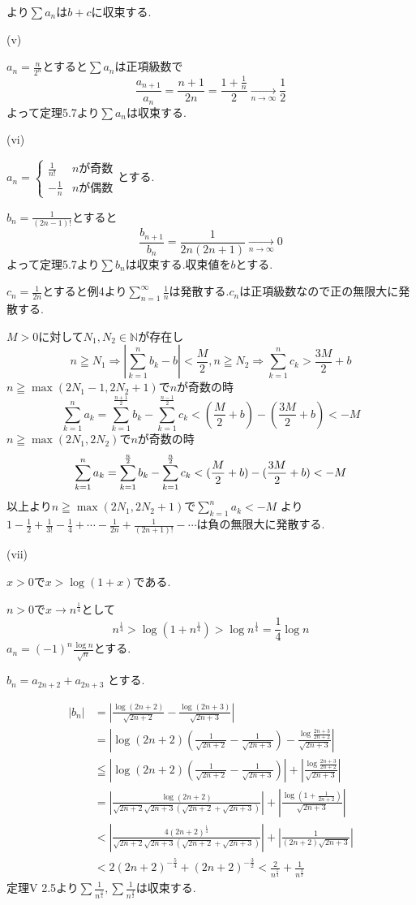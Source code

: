 \documentclass{jsarticle}
\begin{document}
より$\sum a_n$は$b+c$に収束する.

(v)

$a_n=\frac{n}{2^n}$とすると$\sum a_n$は正項級数で
\[\frac{a_{n+1}}{a_n}=\frac{n+1}{2n}=\frac{1+\frac{1}{n}}{2}\xrightarrow[n\to\infty]{}\frac{1}{2}\]
よって定理5.7より$\sum a_n$は収束する.

(vi)

$a_n = \begin{cases}
\frac{1}{n!} & nが奇数 \\
-\frac{1}{n} & nが偶数　
\end{cases}$とする.

$b_n=\frac{1}{(2n-1)!}$とすると
\[\frac{b_{n+1}}{b_n}=\frac{1}{2n(2n+1)}\xrightarrow[n\to\infty]{}0\]
よって定理5.7より$\sum b_n$は収束する.収束値を$b$とする.

$c_n=\frac{1}{2n}$とすると例4より$\displaystyle \sum_{n=1}^\infty \frac{1}{n}$は発散する.$c_n$は正項級数なので正の無限大に発散する.

$M > 0$に対して$N_1,N_2\in\mathbb{N}$が存在し
\[n\geqq N_1 \Rightarrow |\sum_{k=1}^nb_k-b| < \frac{M}{2},n\geqq N_2 \Rightarrow \sum_{k=1}^nc_k > \frac{3M}{2}+b\]
$n\geqq \max (2N_1-1,2N_2+1)$で$n$が奇数の時
\[\sum_{k=1}^n a_k = \sum_{k=1}^{\frac{n+1}{2}} b_k - \sum_{k=1}^{\frac{n-1}{2}}c_k
< (\frac{M}{2}+b) - (\frac{3M}{2}+b) < -M\]
$n\geqq \max (2N_1,2N_2)$で$n$が奇数の時
\[
\sum_{k=1}^n a_k = \sum_{k=1}^{\frac{n}{2}} b_k - \sum_{k=1}^{\frac{n}{2}}c_k\\
< (\frac{M}{2}+b) - (\frac{3M}{2}+b) < -M
\]
以上より$n\geqq \max (2N_1,2N_2+1)$で$\displaystyle\sum_{k=1}^n a_k < -M$
より$1-\frac{1}{2}+\frac{1}{3!}-\frac{1}{4}+\cdots -\frac{1}{2n}+\frac{1}{(2n+1)!}-\cdots$は負の無限大に発散する.

(vii)

$x > 0$で$x >\log (1+x)$である.

$n > 0$で$x\rightarrow n^{\frac{1}{4}}$として
\[n^\frac{1}{4} > \log (1+n^\frac{1}{4}) >\log n^\frac{1}{4} = \frac{1}{4}\log n\]
$a_n = (-1)^n\frac{\log n}{\sqrt{n}}$とする.

$b_n=a_{2n+2}+a_{2n+3}$
とする.

\begin{align*}
|b_n| &= |\frac{\log (2n+2)}{\sqrt{2n+2}}-\frac{\log (2n+3)}{\sqrt{2n+3}}|\\
&=|\log (2n+2) (\frac{1}{\sqrt{2n+2}}-\frac{1}{\sqrt{2n+3}}) - \frac{\log \frac{2n+3}{2n+2}}{\sqrt{2n+3}}|\\
&\leqq |\log (2n+2) (\frac{1}{\sqrt{2n+2}}-\frac{1}{\sqrt{2n+3}})| +| \frac{\log \frac{2n+3}{2n+2}}{\sqrt{2n+3}}|\\
&= |\frac{\log (2n+2)}{\sqrt{2n+2}\sqrt{2n+3}(\sqrt{2n+2}+\sqrt{2n+3})}| +|\frac{\log (1+\frac{1}{2n+2})}{\sqrt{2n+3}}|\\
& < |\frac{4(2n+2)^{\frac{1}{4}}}{\sqrt{2n+2}\sqrt{2n+3}(\sqrt{2n+2}+\sqrt{2n+3})}|+|\frac{1}{(2n+2)\sqrt{2n+3}}|\\
& < 2(2n+2)^{-\frac{5}{4}}+(2n+2)^{-\frac{3}{2}}<\frac{2}{n^\frac{5}{4}}+\frac{1}{n^\frac{3}{2}}
\end{align*}
定理V 2.5より$\sum \frac{1}{n^{\frac{5}{4}}},\sum \frac{1}{n^{\frac{3}{2}}}$は収束する.
\end{document}
